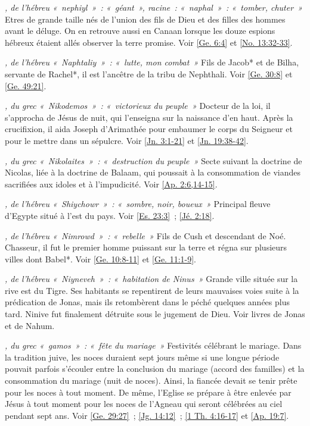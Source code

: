 \begin{multicols}{2}
\textit{, de l'hébreu «~nephiyl~»~: «~géant~», racine~: «~naphal~»~: «~tomber, chuter~»}\newline
Etres de grande taille nés de l'union des fils de Dieu et des filles des hommes avant le déluge. On en retrouve aussi en Canaan lorsque les douze espions hébreux étaient allés observer la terre promise. Voir \vref{Ge. 6:4} et \vref{No. 13:32-33}.

\textit{, de l'hébreu «~Naphtaliy~»~: «~lutte, mon combat~»}\newline
Fils de Jacob* et de Bilha, servante de Rachel*, il est l'ancêtre de la tribu de Nephthali. Voir \vref{Ge. 30:8} et \vref{Ge. 49:21}.

\textit{, du grec «~Nikodemos~»~: «~victorieux du peuple~»}\newline
Docteur de la loi, il s'approcha de Jésus de nuit, qui l'enseigna sur la naissance d'en haut. Après la crucifixion, il aida Joseph d'Arimathée pour embaumer le corps du Seigneur et pour le mettre dans un sépulcre. Voir \vref{Jn. 3:1-21} et \vref{Jn. 19:38-42}.

\textit{, du grec «~Nikolaites~»~: «~destruction du peuple~»}\newline
Secte suivant la doctrine de Nicolas, liée à la doctrine de Balaam, qui poussait à la consommation de viandes sacrifiées aux idoles et à l'impudicité. Voir \vref{Ap. 2:6,14-15}.

\textit{, de l'hébreu «~Shiychowr~»~: «~sombre, noir, boueux~»}\newline
Principal fleuve d'Egypte situé à l'est du pays. Voir \vref{Es. 23:3}~; \vref{Jé. 2:18}.

\textit{, de l'hébreu «~Nimrowd~»~: «~rebelle~»}\newline
Fils de Cush et descendant de Noé. Chasseur, il fut le premier homme puissant sur la terre et régna sur plusieurs villes dont Babel*. Voir \vref{Ge. 10:8-11} et \vref{Ge. 11:1-9}.

\textit{, de l'hébreu «~Niyneveh~»~: «~habitation de Ninus~»}\newline
Grande ville située sur la rive est du Tigre. Ses habitants se repentirent de leurs mauvaises voies suite à la prédication de Jonas, mais ils retombèrent dans le péché quelques années plus tard. Ninive fut finalement détruite sous le jugement de Dieu. Voir livres de Jonas et de Nahum.

\textit{, du grec «~gamos~»~: «~fête du mariage~»}\newline
Festivités célébrant le mariage. Dans la tradition juive, les noces duraient sept jours même si une longue période pouvait parfois s'écouler entre la conclusion du mariage (accord des familles) et la consommation du mariage (nuit de noces). Ainsi, la fiancée devait se tenir prête pour les noces à tout moment. De même, l'Eglise se prépare à être enlevée par Jésus à tout moment pour les noces de l'Agneau qui seront célébrées au ciel pendant sept ans. Voir \vref{Ge. 29:27}~; \vref{Jg. 14:12}~; \vref{1 Th. 4:16-17} et \vref{Ap. 19:7}.


\end{multicols}
